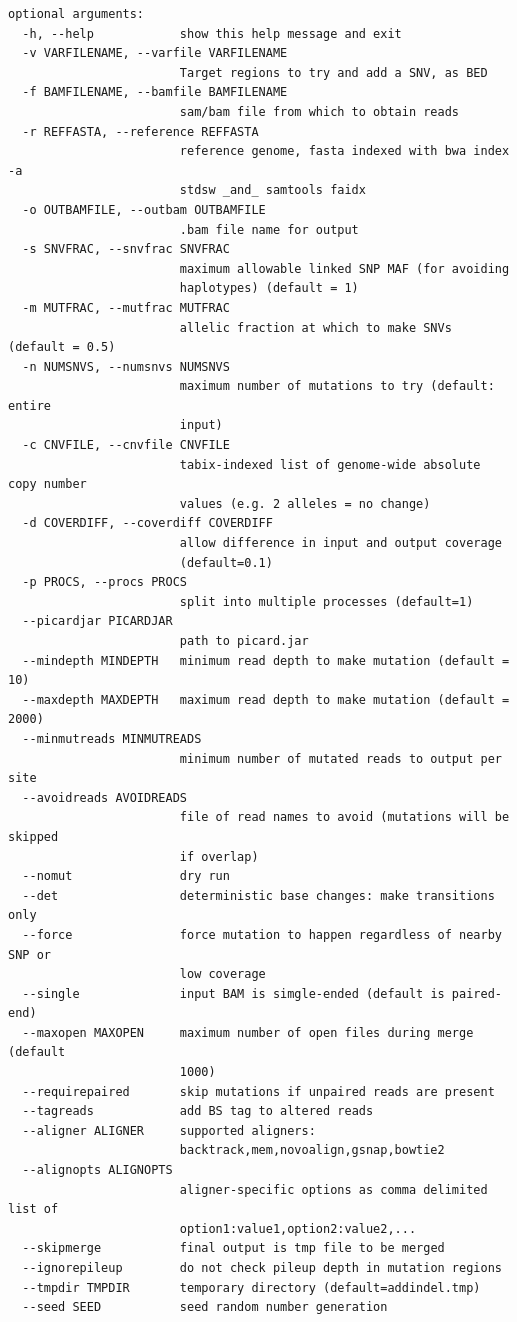 \documentclass[letterpaper,11pt]{article}
\begin{document}
\begin{verbatim}
optional arguments:
  -h, --help            show this help message and exit
  -v VARFILENAME, --varfile VARFILENAME
                        Target regions to try and add a SNV, as BED
  -f BAMFILENAME, --bamfile BAMFILENAME
                        sam/bam file from which to obtain reads
  -r REFFASTA, --reference REFFASTA
                        reference genome, fasta indexed with bwa index -a
                        stdsw _and_ samtools faidx
  -o OUTBAMFILE, --outbam OUTBAMFILE
                        .bam file name for output
  -s SNVFRAC, --snvfrac SNVFRAC
                        maximum allowable linked SNP MAF (for avoiding
                        haplotypes) (default = 1)
  -m MUTFRAC, --mutfrac MUTFRAC
                        allelic fraction at which to make SNVs (default = 0.5)
  -n NUMSNVS, --numsnvs NUMSNVS
                        maximum number of mutations to try (default: entire
                        input)
  -c CNVFILE, --cnvfile CNVFILE
                        tabix-indexed list of genome-wide absolute copy number
                        values (e.g. 2 alleles = no change)
  -d COVERDIFF, --coverdiff COVERDIFF
                        allow difference in input and output coverage
                        (default=0.1)
  -p PROCS, --procs PROCS
                        split into multiple processes (default=1)
  --picardjar PICARDJAR
                        path to picard.jar
  --mindepth MINDEPTH   minimum read depth to make mutation (default = 10)
  --maxdepth MAXDEPTH   maximum read depth to make mutation (default = 2000)
  --minmutreads MINMUTREADS
                        minimum number of mutated reads to output per site
  --avoidreads AVOIDREADS
                        file of read names to avoid (mutations will be skipped
                        if overlap)
  --nomut               dry run
  --det                 deterministic base changes: make transitions only
  --force               force mutation to happen regardless of nearby SNP or
                        low coverage
  --single              input BAM is simgle-ended (default is paired-end)
  --maxopen MAXOPEN     maximum number of open files during merge (default
                        1000)
  --requirepaired       skip mutations if unpaired reads are present
  --tagreads            add BS tag to altered reads
  --aligner ALIGNER     supported aligners:
                        backtrack,mem,novoalign,gsnap,bowtie2
  --alignopts ALIGNOPTS
                        aligner-specific options as comma delimited list of
                        option1:value1,option2:value2,...
  --skipmerge           final output is tmp file to be merged
  --ignorepileup        do not check pileup depth in mutation regions
  --tmpdir TMPDIR       temporary directory (default=addindel.tmp)
  --seed SEED           seed random number generation
  
\end{verbatim}
\end{document}
